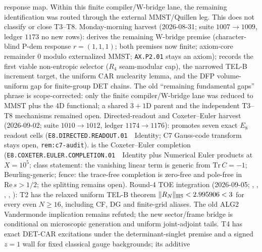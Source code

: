 response map.  Within this finite compiler/W-bridge lane, the remaining identification
was routed through the external MMST/Quillen leg.  This does not classify or close T3--T8.
Monday-morning harvest (2026-08-31; suite $1007\to1009$, ledger $1173$ no new rows):
derives the remaining W-bridge premise (character-blind P-dem response $r=(1,1,1)$;
both premises now finite; axiom-core remainder $0$ modulo externalized MMST;
\texttt{AX.P2.01} stays an axiom);
records the first viable non-entropic selector ($R_4$ seam-modular cap), the narrowed
TEL-B increment target, the uniform CAR nuclearity lemma, and the DFP volume-uniform gap
for finite-group DET chains.  The old ``remaining fundamental gaps'' phrase is
scope-corrected: only the finite compiler/W-bridge lane was reduced to MMST plus the
$4$D functional; a shared $3{+}1$D parent and the independent T3--T8 mechanisms remained open.
Directed-readout and Coxeter--Euler harvest (2026-09-02; suite $1010\to1012$, ledger $1174\to1176$):
promotes seven exact $E_8$ readout cells (\texttt{E8.DIRECTED.READOUT.01}~\mE\ Identity;
C7 Gauss-code transform stays open, \texttt{rem:c7-audit}).
is the Coxeter--Euler completion (\texttt{E8.COXETER.EULER.COMPLETION.01}~\mE\ Identity plus Numerical Euler products at $X=10^5$;
class statement: the vanishing linear term is generic from $\mathrm{Tr}\,C=-1$; Beurling-generic;
fence: the trace-free completion is zero-free and pole-free in $\mathrm{Re}\,s>1/2$; the splitting remains open).
Round-4 TOE integration (2026-09-05;
,
,
,
,
):
T2 has the relaxed uniform TEL-B theorem $\|R_N\|_{\rm HS}<2.995906<3$
for every even $N\ge16$, including CF, DG and finite-grid aliases. The old
ALG2 Vandermonde implication remains refuted; the new sector/frame bridge
is conditional on microscopic generation and uniform joint-adjoint tails.
T4 has exact DET-CAR excitations under the determinant-singlet premise and
a signed $z=1$ wall for fixed classical gauge backgrounds; its additive
